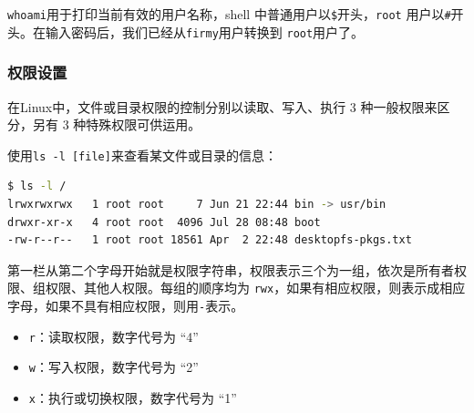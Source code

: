 \indent \verb+whoami+用于打印当前有效的用户名称，shell 中普通用户以\verb+$+开头，\verb+root+ 用户以\verb+#+开头。在输入密码后，我们已经从\verb+firmy+用户转换到 \verb+root+用户了。

\subsubsection{权限设置}
\indent \setlength{\parindent}{2em}

\intent 在Linux中，文件或目录权限的控制分别以读取、写入、执行 3 种一般权限来区分，另有 3 种特殊权限可供运用。

\indent 使用\verb+ls -l [file]+来查看某文件或目录的信息：
\begin{lstlisting}[language=bash, style=customStyleBashDark, caption=查看文件目录信息]
$ ls -l /
lrwxrwxrwx   1 root root     7 Jun 21 22:44 bin -> usr/bin
drwxr-xr-x   4 root root  4096 Jul 28 08:48 boot
-rw-r--r--   1 root root 18561 Apr  2 22:48 desktopfs-pkgs.txt
\end{lstlisting}

\indent 第一栏从第二个字母开始就是权限字符串，权限表示三个为一组，依次是所有者权限、组权限、其他人权限。每组的顺序均为 \verb+rwx+，如果有相应权限，则表示成相应字母，如果不具有相应权限，则用\verb+-+表示。

\begin{itemize}
    \item \verb+r+：读取权限，数字代号为 “4”
    \item \verb+w+：写入权限，数字代号为 “2”
    \item \verb+x+：执行或切换权限，数字代号为 “1”
\end{itemize}

